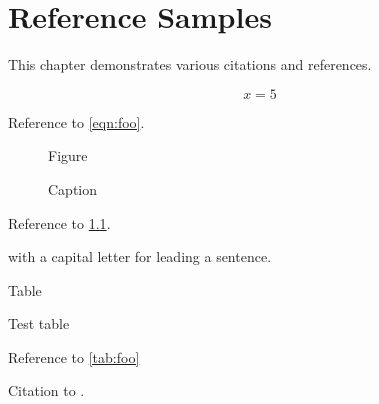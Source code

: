 \chapter{Reference Samples}

This chapter demonstrates various citations and references.

\begin{equation}\label{eqn:foo}
  x = 5
\end{equation}

Reference to \cref{eqn:foo}.

\begin{figure}[h!]
  \centering
  Figure
  \caption{Caption}
  \label{fig:foo}
\end{figure}

Reference to \cref{fig:foo}.

 with a capital letter for leading a sentence.

\begin{table}[h!]
  \centering
  Table
  \caption{Test table}
  \label{tab:foo}
\end{table}

Reference to \cref{tab:foo}

Citation to \cite{Nobody06}.

